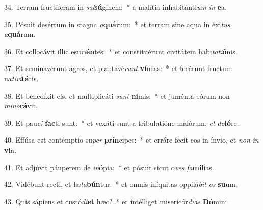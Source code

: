34. Terram fructíferam in \textit{sal}\textbf{sú}ginem:~*  a malítia inhabitánti\textit{um} \textit{in} \textbf{e}a.\

35. Pósuit desértum in stagna \textit{a}\textbf{quá}rum:~*  et terram sine aqua in éxi\textit{tus} \textit{a}\textbf{quá}rum.\

36. Et collocávit illic esu\textit{ri}\textbf{én}tes:~*  et constituérunt civitátem habi\textit{ta}\textit{ti}\textbf{ó}nis.\

37. Et seminavérunt agros, et plantavé\textit{runt} \textbf{ví}neas:~*  et fecérunt fructum na\textit{ti}\textit{vi}\textbf{tá}tis.\

38. Et benedíxit eis, et multiplicáti \textit{sunt} \textbf{ni}mis:~*  et juménta eórum non \textit{mi}\textit{no}\textbf{rá}vit.\

39. Et pau\textit{ci} \textbf{fac}ti sunt:~*  et vexáti sunt a tribulatióne malórum, \textit{et} \textit{do}\textbf{ló}re.\

40. Effúsa est contémptio su\textit{per} \textbf{prín}cipes:~*  et erráre fecit eos in ínvio, et \textit{non} \textit{in} \textbf{vi}a.\

41. Et adjúvit páuperem de \textit{in}\textbf{ó}pia:~*  et pósuit sicut o\textit{ves} \textit{fa}\textbf{mí}lias.\

42. Vidébunt recti, et læ\textit{ta}\textbf{bún}tur:~*  et omnis iníquitas oppilá\textit{bit} \textit{os} \textbf{su}um.\

43. Quis sápiens et custó\textit{di}\textbf{et} hæc?~*  et intélliget misericór\textit{di}\textit{as} \textbf{Dó}mini.\

